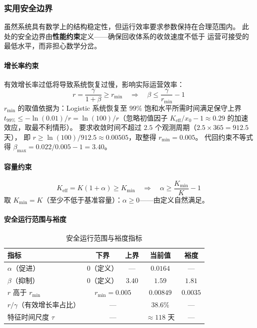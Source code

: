 \documentclass[12pt,a4paper]{ctexart}
\begin{document}
\subsubsection{实用安全边界}

虽然系统具有数学上的结构稳定性，但运行效率要求参数保持在合理范围内。
此处的安全边界由\textbf{性能约束}定义——确保回收体系的收敛速度不低于
运营可接受的最低水平，而非担心数学分岔。

\paragraph{增长率约束}

有效增长率过低将导致系统恢复过慢，影响实际运营效率：
\begin{equation}
r = \frac{\gamma}{1+\beta} \geq r_{\min} \quad\Rightarrow\quad
\beta \leq \frac{\gamma}{r_{\min}} - 1
\end{equation}
$r_{\min}$ 的取值依据为：Logistic 系统恢复至 $99\%$ 饱和水平所需时间满足保守上界
$t_{99\%} \leq -\ln(0.01)/r = \ln(100)/r$（忽略初值因子
$K_{\text{eff}}/x_0-1 \approx 0.29$ 的加速效应，取最不利情形）。
要求收敛时间不超过 $2.5$ 个观测周期（$2.5 \times 365 = 912.5$ 天），
即 $r \geq \ln(100)/912.5 \approx 0.00505$，取整得 $r_{\min} = 0.005$。
代回约束不等式得 $\beta_{\max} = 0.022/0.005 - 1 = 3.40$。

\paragraph{容量约束}
\begin{equation}
K_{\text{eff}} = K(1+\alpha) \geq K_{\min} \quad\Rightarrow\quad
\alpha \geq \frac{K_{\min}}{K} - 1
\end{equation}
取 $K_{\min} = K$（至少不低于基准容量）：$\alpha \geq 0$——由定义自然满足。

\paragraph{安全运行范围与裕度}

\begin{table}[htbp]
\centering
\caption{安全运行范围与裕度指标}
\label{tab:safety_margins}
\begin{tabular}{lcccc}
\toprule
指标 & 下界 & 上界 & 当前值 & 裕度 \\
\midrule
$\alpha$（促进） & $0$（定义） & — & $0.0164$ & — \\
$\beta$（抑制） & $0$（定义） & $3.40$ & $1.59$ & $1.81$ \\
\midrule
$r$ 高于 $r_{\min}$ & \multicolumn{2}{c}{$r_{\min}=0.005$} & $0.00849$ & $0.0035$ \\
$r/\gamma$（有效增长率占比）& \multicolumn{2}{c}{—} & $38.6\%$ & — \\
特征时间尺度 $\tau$ & \multicolumn{2}{c}{—} & $\approx 118$ 天 & — \\
\bottomrule
\end{tabular}
\end{table}
\end{document}
